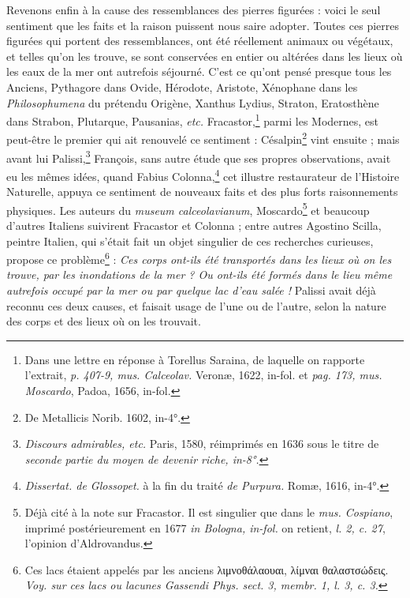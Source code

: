 \documentclass[a4paper, 11pt, oneside, polutonikogreek, french]{article}
\begin{document}
Revenons enfin à la cause des ressemblances des pierres figurées : voici le seul sentiment que les faits et la raison puissent nous saire adopter. Toutes ces pierres figurées qui portent des ressemblances, ont été réellement animaux ou végétaux, et telles qu'on les trouve, se sont conservées en entier ou altérées dans les lieux où les eaux de la mer ont autrefois séjourné. C'est ce qu'ont pensé presque tous les Anciens, Pythagore dans Ovide, Hérodote, Aristote, Xénophane dans les \emph{Philosophumena} du prétendu Origène, Xanthus Lydius, Straton, Eratosthène dans Strabon, Plutarque, Pausanias, \emph{etc.} Fracastor,\footnote{Dans une lettre en réponse à Torellus Saraina, de laquelle on rapporte l'extrait, \emph{p. 407-9, mus. Calceolav.} Veronæ, 1622, in-fol. et \emph{pag. 173, mus. Moscardo}, Padoa, 1656, in-fol.} parmi les Modernes, est peut-être le premier qui ait renouvelé ce sentiment : Césalpin\footnote{De Metallicis Norib. 1602, in-4°.} vint ensuite ; mais avant lui Palissi,\footnote{\emph{Discours admirables, etc.} Paris, 1580, réimprimés en 1636 sous le titre de \emph{seconde partie du moyen de devenir riche, in-8°.}} François, sans autre étude que ses propres observations, avait eu les mêmes idées, quand Fabius Colonna,\footnote{\emph{Dissertat. de Glossopet.} à la fin du traité \emph{de Purpura.} Romæ, 1616, in-4°.} cet illustre restaurateur de l'Histoire Naturelle, appuya ce sentiment de nouveaux faits et des plus forts raisonnements physiques. Les auteurs du \emph{museum calceolavianum}, Moscardo\footnote{Déjà cité à la note sur Fracastor. Il est singulier que dans le \emph{mus. Cospiano}, imprimé postérieurement en 1677 \emph{in Bologna, in-fol.} on retient, \emph{l. 2, c. 27}, l'opinion d'Aldrovandus.} et beaucoup d'autres Italiens suivirent Fracastor et Colonna ; entre autres Agostino Scilla, peintre Italien, qui s'était fait un objet singulier de ces recherches curieuses, propose ce problème\footnote{Ces lacs étaient appelés par les anciens λιμνοθάλαουαι, λίμναι θαλαστσώδεις. \emph{Voy. sur ces lacs ou lacunes Gassendi Phys. sect. 3, membr. 1, l. 3, c. 3.}} : \emph{Ces corps ont-ils été transportés dans les lieux où on les trouve, par les inondations de la mer ? Ou ont-ils été formés dans le lieu même autrefois occupé par la mer ou par quelque lac d'eau salée !} Palissi avait déjà reconnu ces deux causes, et faisait usage de l'une ou de l'autre, selon la nature des corps et des lieux où on les trouvait.
\end{document}
